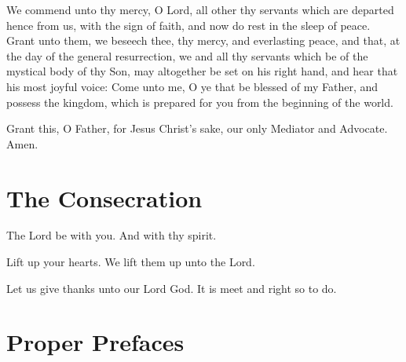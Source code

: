 We commend unto thy mercy, O Lord, all other thy servants which are departed hence from us, with the sign of faith, and now do rest in the sleep of peace.  Grant unto them, we beseech thee, thy mercy, and everlasting peace, and that, at the day of the general resurrection, we and all thy servants which be of the mystical body of thy Son, may altogether be set on his right hand, and hear that his most joyful voice: Come unto me, O ye that be blessed of my Father, and possess the kingdom, which is prepared for you from the beginning of the world. 



Grant this, O Father, for Jesus Christ's sake, our only Mediator and Advocate. \R Amen.

\section{The Consecration}

\V The Lord be with you. \R And with thy spirit.

\V Lift up your hearts.  \R We lift them up unto the Lord.

\V Let us give thanks unto our Lord God. \R It is meet and right so to do.

\centerline{}


{\footnotesize\centering{}\par}



\section*{Proper Prefaces}

